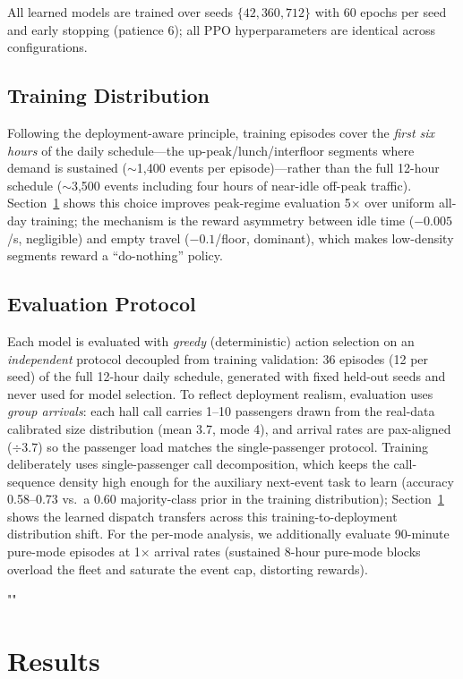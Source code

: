 \documentclass{ieeeaccess}
\begin{document}
All learned models are trained over seeds $\{42, 360, 712\}$ with 60
epochs per seed and early stopping (patience 6); all PPO
hyperparameters are identical across configurations.

\subsection{Training Distribution}

Following the deployment-aware principle, training episodes cover
the \emph{first six hours} of the daily schedule---the
up-peak/lunch/interfloor segments where demand is sustained
($\sim$1{,}400 events per episode)---rather than the full 12-hour
schedule ($\sim$3{,}500 events including four hours of near-idle
off-peak traffic). Section~\ref{sec:results} shows this choice
improves peak-regime evaluation 5$\times$ over uniform all-day
training; the mechanism is the reward asymmetry between idle time
($-0.005$/s, negligible) and empty travel ($-0.1$/floor,
dominant), which makes low-density segments reward a
``do-nothing'' policy.

\subsection{Evaluation Protocol}

Each model is evaluated with \emph{greedy} (deterministic) action
selection on an \emph{independent} protocol decoupled from training
validation: 36 episodes (12 per seed) of the full 12-hour daily
schedule, generated with fixed held-out seeds and never used for
model selection. To reflect deployment realism, evaluation uses
\emph{group arrivals}: each hall call carries 1--10 passengers drawn
from the real-data calibrated size distribution (mean 3.7, mode 4),
and arrival rates are pax-aligned ($\div 3.7$) so the passenger load
matches the single-passenger protocol. Training deliberately uses
single-passenger call decomposition, which keeps the call-sequence
density high enough for the auxiliary next-event task to learn
(accuracy 0.58--0.73 vs.~a 0.60 majority-class prior in the
training distribution); Section~\ref{sec:results}
shows the learned dispatch transfers across this
training-to-deployment distribution shift.
For the per-mode analysis, we additionally evaluate 90-minute
pure-mode episodes at 1$\times$ arrival rates (sustained 8-hour
pure-mode blocks overload the fleet and saturate the event cap,
distorting rewards).

""\\\section{Results}
\label{sec:results}
\end{document}
